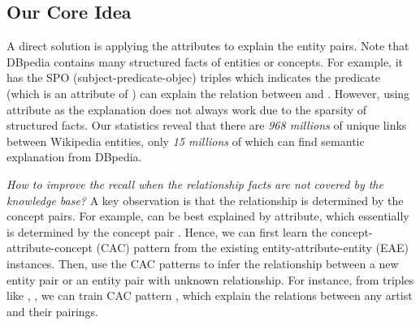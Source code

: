 \subsection{Our Core Idea}
A direct solution is applying the attributes to explain the entity pairs.
Note that DBpedia contains many structured facts of entities or concepts.
For example, it has the SPO (subject-predicate-objec) triples  which indicates the predicate  (which is an attribute of ) can explain the relation between  and .
However, using attribute as the explanation does not always work due to the sparsity of structured facts.
Our statistics reveal that there are \emph{968 millions} of unique links between Wikipedia entities, only \emph{15 millions} of which can find semantic explanation from DBpedia.


{\it How to improve the recall when the relationship facts are not covered by the knowledge base?}
A key observation is that the relationship is determined by the concept pairs. For example,  can be best explained by  attribute, which essentially is determined by the concept pair . Hence, we can first learn the concept-attribute-concept (CAC) pattern from the existing entity-attribute-entity (EAE) instances. Then, use the CAC patterns to infer the relationship between a new entity pair or an entity pair with unknown relationship.
For instance, from triples like , , we can train CAC pattern , which explain the  relations between any artist and their pairings.

